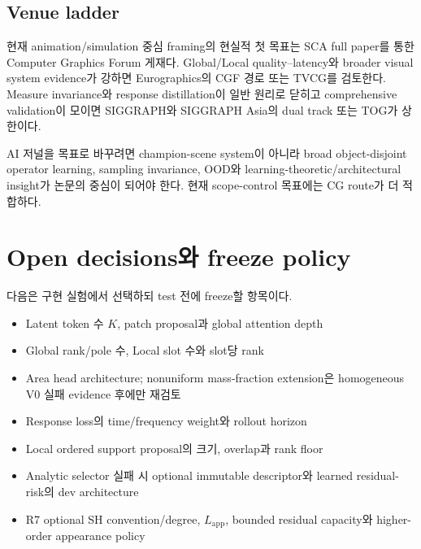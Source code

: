 \documentclass[11pt]{article}
\begin{document}
\subsection{Venue ladder}

현재 animation/simulation 중심 framing의 현실적 첫 목표는 SCA full paper를 통한
Computer Graphics Forum 게재다. Global/Local quality--latency와 broader visual system evidence가 강하면
Eurographics의 CGF 경로 또는 TVCG를 검토한다. Measure invariance와 response distillation이 일반 원리로 닫히고
comprehensive validation이 모이면 SIGGRAPH와 SIGGRAPH Asia의 dual track 또는 TOG가 상한이다.

AI 저널을 목표로 바꾸려면 champion-scene system이 아니라 broad object-disjoint operator learning,
sampling invariance, OOD와 learning-theoretic/architectural insight가 논문의 중심이 되어야 한다.
현재 scope-control 목표에는 CG route가 더 적합하다.

\section{Open decisions와 freeze policy}

다음은 구현 실험에서 선택하되 test 전에 freeze할 항목이다.
\begin{itemize}
  \item Latent token 수 \(K\), patch proposal과 global attention depth
  \item Global rank/pole 수, Local slot 수와 slot당 rank
  \item Area head architecture; nonuniform mass-fraction extension은 homogeneous V0 실패 evidence 후에만 재검토
  \item Response loss의 time/frequency weight와 rollout horizon
  \item Local ordered support proposal의 크기, overlap과 rank floor
  \item Analytic selector 실패 시 optional immutable descriptor와 learned residual-risk의 dev architecture
  \item R7 optional SH convention/degree, \(L_{\mathrm{app}}\), bounded residual capacity와 higher-order appearance policy
\end{itemize}
\end{document}
